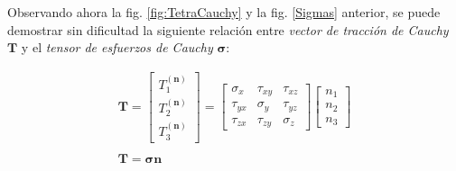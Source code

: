 	Observando ahora la fig. \ref{fig:TetraCauchy} y la fig. \ref{Sigmas} anterior, se puede demostrar sin dificultad la siguiente relación entre \textit{vector de tracción de Cauchy} $\mathbf{T}$ y  el \textit{tensor de esfuerzos de Cauchy} $\bm{\sigma}$:
	
	
	\begin{equation}
		\begin{array}{c}
			\mathbf{T} = 
			\begin{bmatrix}
				T_1 ^{(\mathbf{n})} \\ T_2 ^{(\mathbf{n})} \\ T_3 ^{(\mathbf{n})}
			\end{bmatrix} = \begin{bmatrix}
			\sigma_x & \tau_{xy} & \tau_{xz} \\
			\tau_{yx} & \sigma_y & \tau_{yz} \\
			\tau_{zx} & \tau_{zy} & \sigma_z
		\end{bmatrix} \begin{bmatrix}
				n_1 \\ n_2 \\ n_3
			\end{bmatrix} \\ \\
			\boxed{\mathbf{T} = \bm{\sigma} \mathbf{n}}
		\end{array}
		\label{eq:tSigma}
	\end{equation}
	
